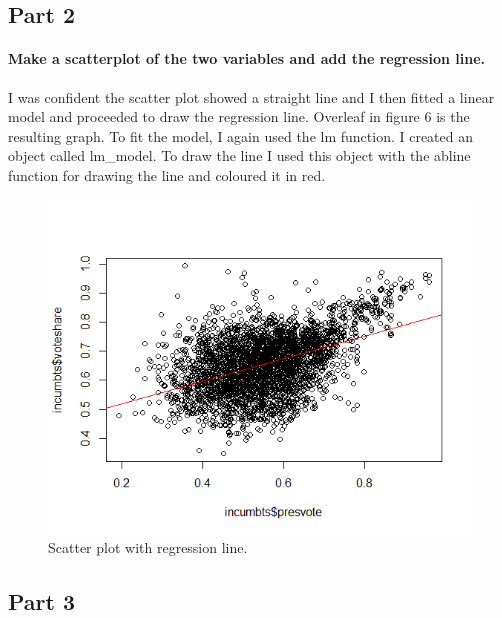 \documentclass{article}
\begin{document}
\subsection{Part 2}
\paragraph{Make a scatterplot of the two variables and add the regression line.}
I was confident the scatter plot showed a straight line and I then fitted a linear model and proceeded to draw the regression line. Overleaf in figure 6 is the resulting graph. To fit the model, I again used the lm function. I created an object called lm\_model. To draw the line I used this object with the abline function for drawing the line and coloured it in red.
\begin{figure}[H]
	\centering
	\includegraphics[width=0.9\linewidth]{Question3 - Scatter Plot with regression line.png}
	\caption{Scatter plot with regression line.}
	\label{fig:Scatter plot with regression line}
\end{figure}
\subsection{Part 3}
\end{document}
